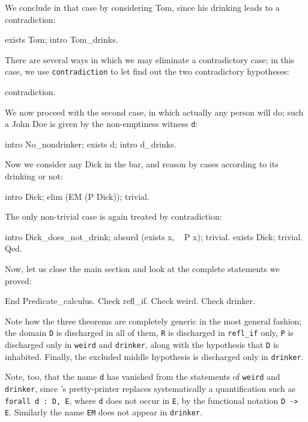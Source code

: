 \documentclass[11pt,a4paper]{book}
\begin{document}
We conclude in that case by considering Tom, since his drinking leads to
a contradiction:
\begin{coq_example}
exists Tom; intro Tom_drinks.
\end{coq_example}

There are several ways in which we may eliminate a contradictory case;
in this case, we use \verb:contradiction: to let \Coq{} find out the
two contradictory hypotheses:
\begin{coq_example}
contradiction.
\end{coq_example}

We now proceed with the second case, in which actually any person will do;
such a John Doe is given by the non-emptiness witness \verb:d::
\begin{coq_example}
intro No_nondrinker; exists d; intro d_drinks.
\end{coq_example}

Now we consider any Dick in the bar, and reason by cases according to its
drinking or not:
\begin{coq_example}
intro Dick; elim (EM (P Dick)); trivial.
\end{coq_example}

The only non-trivial case is again treated by contradiction:
\begin{coq_example}
intro Dick_does_not_drink; absurd (exists x, ~ P x); trivial.
exists Dick; trivial.
Qed.
\end{coq_example}

Now, let us close the main section and look at the complete statements
we proved:
\begin{coq_example}
End Predicate_calculus.
Check refl_if.
Check weird.
Check drinker.
\end{coq_example}

Note how the three theorems are completely generic in the most general
fashion;
the domain \verb:D: is discharged in all of them, \verb:R: is discharged in
\verb:refl_if: only, \verb:P: is discharged only in \verb:weird: and
\verb:drinker:, along with the hypothesis that \verb:D: is inhabited.
Finally, the excluded middle hypothesis is discharged only in
\verb:drinker:.

Note, too, that the name \verb:d: has vanished from
the statements of \verb:weird: and \verb:drinker:,
since \Coq's pretty-printer replaces
systematically a quantification such as \texttt{forall d : D, E},
where \texttt{d} does not occur in \texttt{E},
by the functional notation \texttt{D -> E}.
Similarly the name \texttt{EM} does not appear in \texttt{drinker}.
\end{document}
